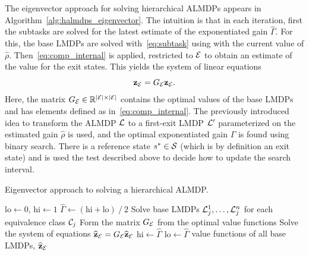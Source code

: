 The eigenvector approach for solving hierarchical ALMDPs appears in Algorithm~\ref{alg:halmdps_eigenvector}. The intuition is that in each iteration, first the subtasks are solved for the latest estimate of the exponentiated gain $\widehat\Gamma$. For this, the base LMDPs are solved with~\eqref{eq:subtask} using with the current value of $\widehat\rho$. Then~\eqref{eq:comp_internal} is applied, restricted to $\mathcal{E}$ to obtain an estimate of the value for the exit states. This yields the system of linear equations
\begin{equation}
    {\bf z_{\mathcal{E}}} = G_{\mathcal{E}} {\bf z_{\mathcal{E}}}.\label{eq:eigenvector}
\end{equation}
Here, the matrix $G_{\mathcal{E}}\in\mathbb{R}^{\lvert\mathcal{E}\rvert\times \lvert\mathcal{E}\rvert}$ contains the optimal values of the base LMDPs and has elements defined as in~\eqref{eq:comp_internal}. The previously introduced idea to transform the ALMDP $\mathcal{L}$ to a first-exit LMDP $\mathcal{L}'$ parameterized on the estimated gain $\widehat\rho$ is used, and  the optimal exponentiated gain $\Gamma$ is found using binary search. There is a reference state $s^*\in\mathcal{S}$ (which is by definition an exit state) and is used the test described above to decide how to update the search interval. 
\begin{algorithm}[!b]
  \caption{Eigenvector approach to solving a hierarchical ALMDP.}
  \begin{algorithmic}[1]

    \State $\text{lo}\gets 0$, $\text{hi}\gets 1$
    \State $\widehat\Gamma \gets (\text{hi} + \text{lo}) \mathbin{/} 2$
    \State Solve base LMDPs $\mathcal{L}_j^1,\ldots,\mathcal{L}_j^n$ for each equivalence class $\mathcal{C}_j$
    \State Form the matrix $G_{\mathcal{E}}$ from the optimal value functions
    \State Solve the system of equations  ${\bf \widehat z_{\mathcal{E}}} = G_{\mathcal{E}} {\bf\widehat z_{\mathcal{E}}}$
    \State $\text{hi}\gets \widehat\Gamma$
    \Else \State $\text{lo}\gets \widehat\Gamma$
    \EndIf
    \vspace*{3pt}
    \EndWhile
    \State \Return value functions of all base LMDPs, ${\bf \widehat z_{\mathcal{E}}}$
  \end{algorithmic}
  \label{alg:halmdps_eigenvector}
\end{algorithm}

